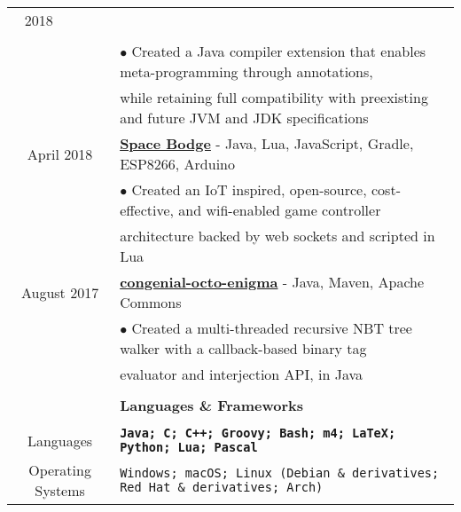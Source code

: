 \documentclass[10pt]{article}
\begin{document}
\begin{table}[ht]
\begin{tabular}{@{\hspace{0mm}}c@{\hspace{1mm}}c@{\hspace{3mm}}cl}
            2018 & & &\\
            \vspace*{-8.5mm}\\
            & & & $\bullet$ Created a Java compiler extension that enables meta-programming through annotations,\\
            & & & \hspace*{3mm}while retaining full compatibility with preexisting and future JVM and JDK specifications\\
            \multicolumn{3}{c}{April 2018} & \textbf{\href{https://github.com/SpaceBodge}{Space Bodge}} - Java, Lua, JavaScript, Gradle, ESP8266, Arduino\\
            & & & $\bullet$ Created an IoT inspired, open-source, cost-effective, and wifi-enabled game controller\\
            & & & \hspace*{3mm}architecture backed by web sockets and scripted in Lua\\
            \multicolumn{3}{c}{August 2017} & \textbf{\href{https://github.com/Matthewacon/congenial-octo-enigma}{congenial-octo-enigma}} - Java, Maven, Apache Commons\\
            & & & $\bullet$ Created a multi-threaded recursive NBT tree walker with a callback-based binary tag\\
            & & & \hspace*{3mm}evaluator and interjection API, in Java\\
            & & & \color{maroon}{\rule{14cm}{0.75pt}}\\
            & & & \large{\textbf{Languages \& Frameworks}}\\[-2mm]
            & & & \color{maroon}{\rule{14cm}{0.75pt}}\\
            \multicolumn{3}{c}{Languages} & \textbf{\texttt{Java; C; C++; Groovy; Bash; m4; \LaTeX; Python; Lua; Pascal}}\\[-1mm]
            \multicolumn{3}{c}{Operating Systems} & \texttt{Windows; macOS; Linux (Debian \& derivatives; Red Hat \& derivatives; Arch)}\\[-1mm]

\end{tabular}
\end{table}
\end{document}
